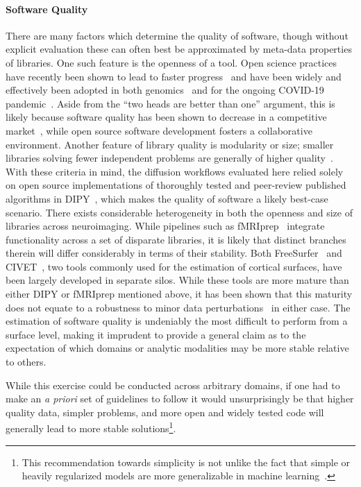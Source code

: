 \paragraph*{Software Quality}
There are many factors which determine the quality of software, though without explicit evaluation these can often
best be approximated by meta-data properties of libraries. One such feature is the openness of a tool. Open science
practices have recently been shown to lead to faster progress~\cite{munafo2017manifesto} and have been widely and
effectively been adopted in both genomics~\cite{goecks2010galaxy} and for the ongoing COVID-19
pandemic~\cite{besanccon2020open}. Aside from the ``two heads are better than one'' argument, this is likely
because software quality has been shown to decrease in a competitive market~\cite{raghunathan2005open}, while open
source software development fosters a collaborative environment. Another feature of library quality is modularity
or size; smaller libraries solving fewer independent problems are generally of higher
quality~\cite{raghunathan2005open}. With these criteria in mind, the diffusion workflows evaluated here relied
solely on open source implementations of thoroughly tested and peer-review published
algorithms in DIPY~\cite{Garyfallidis2014-ql,Garyfallidis2012-gg}, which makes the quality of software a likely
best-case scenario. There exists considerable heterogeneity in both the openness and size of libraries across
neuroimaging. While pipelines such as fMRIprep~\cite{esteban2019fmriprep} integrate functionality across a set of
disparate libraries, it is likely that distinct branches therein will differ considerably in terms of their
stability. Both FreeSurfer~\cite{fischl2012freesurfer} and CIVET~\cite{lepage2017human}, two tools commonly used
for the estimation of cortical surfaces, have been largely developed in separate silos. While these tools are more
mature than either DIPY or fMRIprep mentioned above, it has been shown that this maturity does not equate to a
robustness to minor data perturbations~\cite{Lewis2017-ll} in either case. The estimation of software quality is
undeniably the most difficult to perform from a surface level, making it imprudent to provide a general claim as
to the expectation of which domains or analytic modalities may be more stable relative to others.

While this exercise could be conducted across arbitrary domains, if one had to make an \textit{a priori} set of
guidelines to follow it would unsurprisingly be that higher quality data, simpler problems, and more open and
widely tested code will generally lead to more stable solutions\footnote{This recommendation towards simplicity
is not unlike the fact that simple or heavily regularized models are more generalizable in machine
learning~\cite{lever2016regularization}.}.


